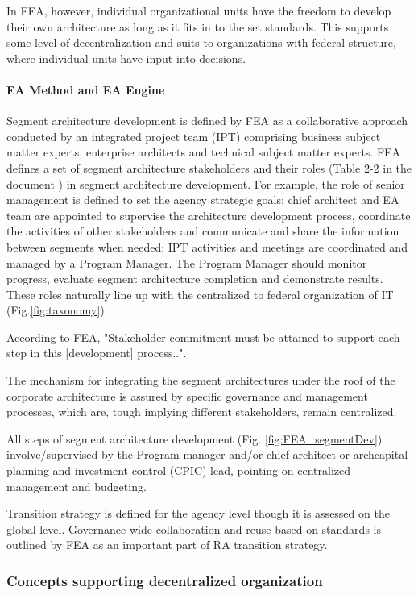 In FEA, however, individual organizational units have the freedom to develop their own architecture as long as it fits in to the set standards. This supports some level of decentralization and suits to organizations with federal structure, where individual units have input into decisions. 

\paragraph*{EA Method and EA Engine}

Segment architecture development is defined by FEA as a collaborative approach conducted by an integrated project team (IPT) comprising business subject matter experts, enterprise architects and technical subject matter experts.  FEA defines a set of segment architecture stakeholders and their roles (Table 2-2 in the document \cite{FEA_PMO2007}) in segment architecture development.   For example, the role of senior management is defined to set the agency strategic goals; chief architect and EA team are appointed to supervise the architecture development process, coordinate the activities of other stakeholders and communicate and share the information between segments when needed; IPT activities and meetings are coordinated and managed by a Program Manager. The Program Manager should monitor progress, evaluate segment architecture completion and demonstrate results. These roles naturally line up with the centralized to federal organization of IT (Fig.\ref{fig:taxonomy}).

According to FEA, "Stakeholder commitment must be attained to support each step in this [development]
 process..".
 
The mechanism for integrating the segment architectures under the roof of the corporate architecture is  assured by specific governance and management processes, which are, tough implying different stakeholders, remain centralized. 

All steps of segment architecture development (Fig. \ref{fig:FEA_segmentDev}) involve/supervised by the Program manager and/or chief architect or archcapital planning and investment control (CPIC) lead, pointing on centralized management and budgeting.

Transition strategy is defined for the agency level though it is assessed on the global level. Governance-wide collaboration and reuse based on standards is outlined by FEA as an important part of RA transition strategy.

\subsubsection{Concepts supporting decentralized organization}
